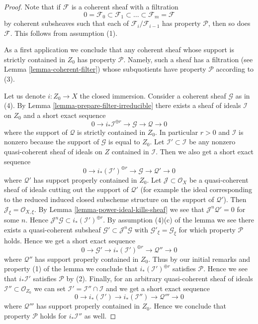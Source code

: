 \begin{proof}
Note that if $\mathcal{F}$ is a coherent sheaf with a filtration
$$
0 = \mathcal{F}_0 \subset \mathcal{F}_1 \subset
\ldots \subset \mathcal{F}_m = \mathcal{F}
$$
by coherent subsheaves such that each of $\mathcal{F}_i/\mathcal{F}_{i - 1}$
has property $\mathcal{P}$, then so does $\mathcal{F}$.
This follows from assumption (1).

\medskip\noindent
As a first application we conclude that any coherent sheaf whose support
is strictly contained in $Z_0$ has property $\mathcal{P}$. Namely, such a
sheaf has a filtration (see Lemma \ref{lemma-coherent-filter})
whose subquotients have property $\mathcal{P}$ according to (3).

\medskip\noindent
Let us denote $i : Z_0 \to X$ the closed immersion.
Consider a coherent sheaf $\mathcal{G}$ as in (4).
By Lemma \ref{lemma-prepare-filter-irreducible}
there exists a sheaf of ideals $\mathcal{I}$ on $Z_0$ and
a short exact sequence
$$
0 \to
i_*\mathcal{I}^{\oplus r} \to
\mathcal{G} \to
\mathcal{Q} \to 0
$$
where the support of $\mathcal{Q}$ is strictly contained in $Z_0$.
In particular $r > 0$ and $\mathcal{I}$ is nonzero
because the support of $\mathcal{G}$ is equal to $Z_0$.
Let $\mathcal{I}' \subset \mathcal{I}$ be any nonzero quasi-coherent
sheaf of ideals on $Z$ contained in $\mathcal{I}$.
Then we also get a short exact sequence
$$
0 \to
i_*(\mathcal{I}')^{\oplus r} \to
\mathcal{G} \to
\mathcal{Q}' \to 0
$$
where $\mathcal{Q}'$ has support properly contained in $Z_0$.
Let $\mathcal{J} \subset \mathcal{O}_X$ be a quasi-coherent sheaf
of ideals cutting out the support of $\mathcal{Q}'$ (for example
the ideal corresponding to the reduced induced closed subscheme
structure on the support of $\mathcal{Q}'$). Then
$\mathcal{J}_\xi = \mathcal{O}_{X, \xi}$. By
Lemma \ref{lemma-power-ideal-kills-sheaf}
we see that $\mathcal{J}^n\mathcal{Q}' = 0$ for some $n$.
Hence $\mathcal{J}^n\mathcal{G} \subset i_*(\mathcal{I}')^{\oplus r}$.
By assumption (4)(c) of the lemma we see there exists
a quasi-coherent subsheaf $\mathcal{G}' \subset \mathcal{J}^n\mathcal{G}$
with $\mathcal{G}'_\xi = \mathcal{G}_\xi$
for which property $\mathcal{P}$ holds.
Hence we get a short exact sequence
$$
0 \to \mathcal{G}' \to
i_*(\mathcal{I}')^{\oplus r} \to
\mathcal{Q}'' \to 0
$$
where $\mathcal{Q}''$ has support properly contained in $Z_0$.
Thus by our initial remarks and property (1) of the lemma
we conclude that $i_*(\mathcal{I}')^{\oplus r}$ satisfies
$\mathcal{P}$. Hence we see that $i_*\mathcal{I}'$ satisfies
$\mathcal{P}$ by (2). Finally, for an arbitrary quasi-coherent
sheaf of ideals $\mathcal{I}'' \subset \mathcal{O}_{Z_0}$ we can set
$\mathcal{I}' = \mathcal{I}'' \cap \mathcal{I}$ and we get
a short exact sequence
$$
0 \to
i_*(\mathcal{I}') \to
i_*(\mathcal{I}'') \to
\mathcal{Q}''' \to 0
$$
where $\mathcal{Q}'''$ has support properly contained in $Z_0$.
Hence we conclude that property $\mathcal{P}$ holds for
$i_*\mathcal{I}''$ as well.


\end{proof}
